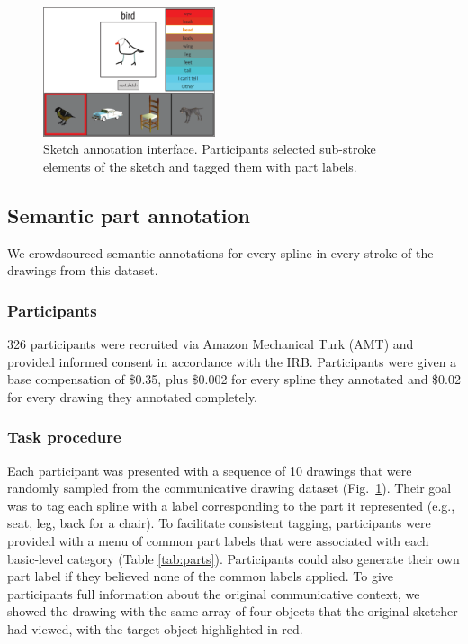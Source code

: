\documentclass[10pt,letterpaper]{article}
\begin{document}
\begin{figure}[htbp]
\centering
\includegraphics[width=0.45\textwidth]{figures/4_annotation_interface.pdf}
\caption{Sketch annotation interface. Participants selected sub-stroke elements of the sketch and tagged them with part labels.} %
\label{annotation_interface}
\vspace{-1em}
\end{figure}

\subsection{Semantic part annotation}

We crowdsourced semantic annotations for every spline in every stroke of the drawings from this dataset. 

\subsubsection{Participants}
326 participants were recruited via Amazon Mechanical Turk (AMT) and provided informed consent in accordance with the  IRB.  %
Participants were given a base compensation of \$0.35, plus \$0.002 for every spline they annotated and \$0.02 for every drawing they annotated completely. 

\subsubsection{Task procedure}
Each participant was presented with a sequence of 10 drawings that were randomly sampled from the communicative drawing dataset (Fig.~\ref{annotation_interface}). 
Their goal was to tag each spline with a label corresponding to the part it represented (e.g., seat, leg, back for a chair).  
To facilitate consistent tagging, participants were provided with a menu of common part labels that were associated with each basic-level category (Table \ref{tab:parts}).
Participants could also generate their own part label if they believed none of the common labels applied.
To give participants full information about the original communicative context, we showed the drawing with the same array of four objects that the original sketcher had viewed, with the target object highlighted in red. 
\end{document}
